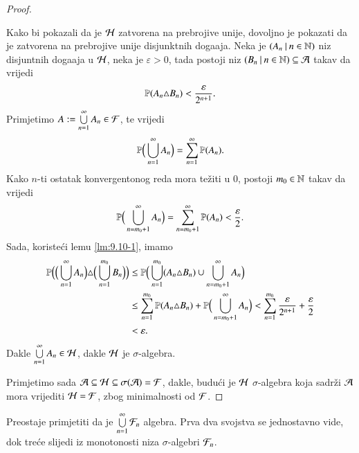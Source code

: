 \begin{rj}[\ref{zad:9.10}]
\begin{proof}
\begin{enumerate}[label=(\roman*)]
            Kako bi pokazali da je $\mathcal{H}$ zatvorena na prebrojive unije, dovoljno je pokazati da je zatvorena na prebrojive unije disjunktnih doga\dj aja.
            Neka je $({A_n} \: | \: {n \in \mathbb{N}})$ niz disjuntnih doga\dj aja u $\mathcal{H}$, neka je $\varepsilon > 0$, tada postoji niz $({B_n} \: | \: {n \in \mathbb{N}}) \subseteq \mathcal{A}$ takav da vrijedi
            \begin{equation*}
                \mathbb{P} (A_n \triangle B_n) < \frac{\varepsilon}{2^{n + 1}}.
            \end{equation*}
            Primjetimo $A := \bigcup\limits_{n = 1}^{\infty} A_n \in \mathcal{F}$, te vrijedi
            \begin{equation*}
                \mathbb{P} \Big( \bigcup\limits_{n = 1}^{\infty} A_n \Big) = \sum\limits_{n = 1}^{\infty} \mathbb{P} (A_n).
            \end{equation*}
            Kako $n$-ti ostatak konvergentonog reda mora te\v ziti u $0$, postoji $m_0 \in \mathbb{N}$ takav da vrijedi
            \begin{equation*}
                \mathbb{P} \Big( \bigcup\limits_{n = m_0 + 1}^{\infty} A_n \Big) = \sum\limits_{n = m_0 + 1}^{\infty} \mathbb{P} (A_n) < \frac{\varepsilon}{2}.
            \end{equation*}
            Sada, koriste\' ci lemu \ref{lm:9.10-1}, imamo
            \begin{equation*}
                \begin{aligned}
                    \mathbb{P} \Big( \Big( \bigcup\limits_{n = 1}^{\infty} A_n \Big) \triangle \Big( \bigcup\limits_{n = 1}^{m_0} B_n \Big) \Big) &\leq \mathbb{P} \Big( \bigcup\limits_{n = 1}^{m_0} (A_n \triangle B_n) \cup \bigcup\limits_{n = m_0 + 1}^{\infty} A_n \Big)\\
                    &\leq \sum\limits_{n = 1}^{m_0} \mathbb{P} (A_n \triangle B_n) + \mathbb{P} \Big( \bigcup\limits_{n = m_0 + 1}^{\infty} A_n \Big) < \sum\limits_{n = 1}^{m_0} \frac{\varepsilon}{2^{n + 1}} + \frac{\varepsilon}{2}\\
                    &< \varepsilon.
                \end{aligned}
            \end{equation*}
            Dakle $\bigcup\limits_{n = 1}^{\infty} A_n \in \mathcal{H}$, dakle $\mathcal{H}$ je $\sigma$-algebra.
        \end{enumerate}
        Primjetimo sada $\mathcal{A} \subseteq \mathcal{H} \subseteq \sigma({\mathcal{A}}) = \mathcal{F}$, dakle, budu\' ci je $\mathcal{H}$ $\sigma$-algebra koja sadr\v zi $\mathcal{A}$ mora vrijediti $\mathcal{H} = \mathcal{F}$, zbog minimalnosti od $\mathcal{F}$.
    \end{proof}

    Preostaje primjetiti da je $\bigcup\limits_{n = 1}^{\infty} \mathcal{F}_n$ algebra.
    Prva dva svojstva se jednostavno vide, dok tre\' ce slijedi iz monotonosti niza $\sigma$-algebri $\mathcal{F}_n$.


\end{rj}
